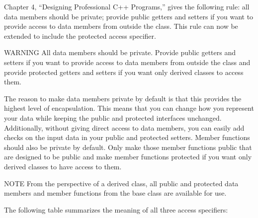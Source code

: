 Chapter 4, “Designing Professional C++ Programs,” gives the following rule: all data members should be private; provide public getters and setters if you want to provide access to data members from outside the class. This rule can now be extended to include the protected access specifier.

\begin{myWarning}{WARNING}
All data members should be private. Provide public getters and setters if you want to provide access to data members from outside the class and provide protected getters and setters if you want only derived classes to access them.
\end{myWarning}

The reason to make data members private by default is that this provides the highest level of encapsulation. This means that you can change how you represent your data while keeping the public and protected interfaces unchanged. Additionally, without giving direct access to data members, you can easily add checks on the input data in your public and protected setters. Member functions should also be private by default. Only make those member functions public that are designed to be public and make member functions protected if you want only derived classes to have access to them.

\begin{myNotic}{NOTE}
From the perspective of a derived class, all public and protected data members and member functions from the base class are available for use.
\end{myNotic}

The following table summarizes the meaning of all three access specifiers:

